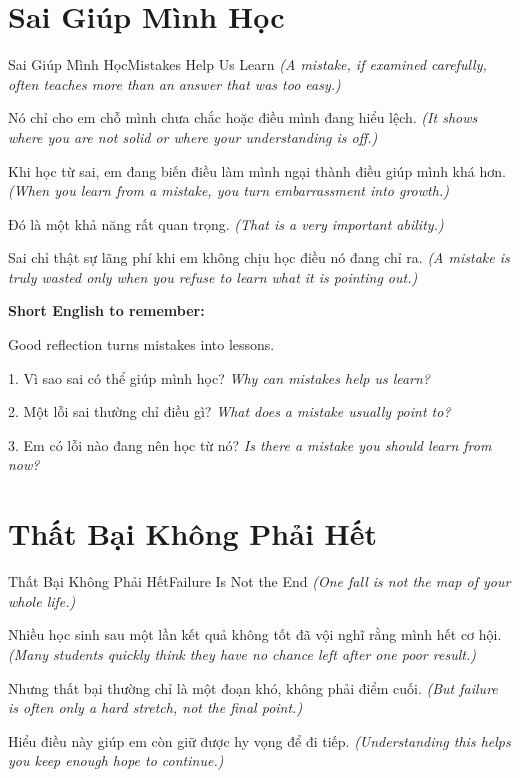 \section{Sai Giúp Mình Học}
\begin{truyen}{Sai Giúp Mình Học}{Mistakes Help Us Learn}
\textit{(A mistake, if examined carefully, often teaches more than an answer that was too easy.)}

Nó chỉ cho em chỗ mình chưa chắc hoặc điều mình đang hiểu lệch.
\textit{(It shows where you are not solid or where your understanding is off.)}

Khi học từ sai, em đang biến điều làm mình ngại thành điều giúp mình khá hơn.
\textit{(When you learn from a mistake, you turn embarrassment into growth.)}

Đó là một khả năng rất quan trọng.
\textit{(That is a very important ability.)}
\end{truyen}

\begin{baihoc}
Sai chỉ thật sự lãng phí khi em không chịu học điều nó đang chỉ ra.
\textit{(A mistake is truly wasted only when you refuse to learn what it is pointing out.)}
\end{baihoc}

\begin{ghinhoanh}
\textbf{Short English to remember:}

Good reflection turns mistakes into lessons.

\end{ghinhoanh}

\begin{tuhocnhanh}
1. Vì sao sai có thể giúp mình học? \textit{Why can mistakes help us learn?}

2. Một lỗi sai thường chỉ điều gì? \textit{What does a mistake usually point to?}

3. Em có lỗi nào đang nên học từ nó? \textit{Is there a mistake you should learn from now?}
\end{tuhocnhanh}
\ngancach

\section{Thất Bại Không Phải Hết}
\begin{truyen}{Thất Bại Không Phải Hết}{Failure Is Not the End}
\textit{(One fall is not the map of your whole life.)}

Nhiều học sinh sau một lần kết quả không tốt đã vội nghĩ rằng mình hết cơ hội.
\textit{(Many students quickly think they have no chance left after one poor result.)}

Nhưng thất bại thường chỉ là một đoạn khó, không phải điểm cuối.
\textit{(But failure is often only a hard stretch, not the final point.)}

Hiểu điều này giúp em còn giữ được hy vọng để đi tiếp.
\textit{(Understanding this helps you keep enough hope to continue.)}
\end{truyen}

